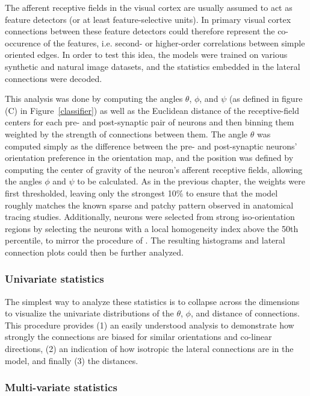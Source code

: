 The afferent receptive fields in the visual cortex are usually assumed
to act as feature detectors (or at least feature-selective units). In
primary visual cortex connections between these feature detectors
could therefore represent the co-occurence of the features,
i.e. second- or higher-order correlations between simple oriented
edges. In order to test this idea, the models were trained on various
synthetic and natural image datasets, and the statistics embedded in
the lateral connections were decoded.

This analysis was done by computing the angles $\theta$, $\phi$, and $\psi$ (as
defined in figure (C) in Figure~\ref{classifier}) as well as the
Euclidean distance of the receptive-field centers for each pre- and
post-synaptic pair of neurons and then binning them weighted by the
strength of connections between them. The angle $\theta$ was computed
simply as the difference between the pre- and post-synaptic neurons'
orientation preference in the orientation map, and the position was
defined by computing the center of gravity of the neuron's afferent receptive
fields, allowing the angles $\phi$ and $\psi$ to be calculated. As in
the previous chapter, the weights were first thresholded, leaving only the
strongest 10\% to ensure that the model roughly matches the known
sparse and patchy pattern observed in anatomical tracing
studies. Additionally, neurons were selected from strong
iso-orientation regions by selecting the neurons with a local
homogeneity index above the 50th percentile, to mirror the procedure
of \cite{Bosking1997}. The resulting histograms and lateral connection
plots could then be further analyzed.

\subsubsection*{Univariate statistics}

The simplest way to analyze these statistics is to collapse across
the dimensions to visualize the univariate distributions of the
$\theta$, $\phi$, and distance of connections. This procedure provides
(1) an easily understood analysis to demonstrate how strongly the
connections are biased for similar orientations and co-linear
directions, (2) an indication of how isotropic the lateral connections
are in the model, and finally (3) the distances.

\subsubsection*{Multi-variate statistics}

